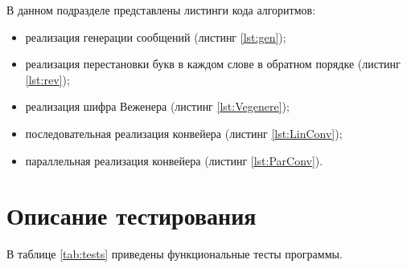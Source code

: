 В данном подразделе представлены листинги кода алгоритмов:
\begin{itemize}[]
    \item реализация генерации сообщений (листинг \ref{lst:gen});
    \item реализация перестановки букв в каждом слове в обратном
          порядке (листинг \ref{lst:rev});
    \item реализация шифра Веженера (листинг \ref{lst:Vegenere});
    \item последовательная реализация конвейера (листинг \ref{lst:LinConv});
    \item параллельная реализация конвейера (листинг \ref{lst:ParConv}).
\end{itemize}



\begin{mdlisting}
    \captionsetup{justification=raggedright,singlelinecheck=off}
    
\end{mdlisting}

\begin{mdlisting}
    \captionsetup{justification=raggedright,singlelinecheck=off}
    
\end{mdlisting}

\section{Описание тестирования}

В таблице \ref{tab:tests} приведены функциональные тесты программы.

